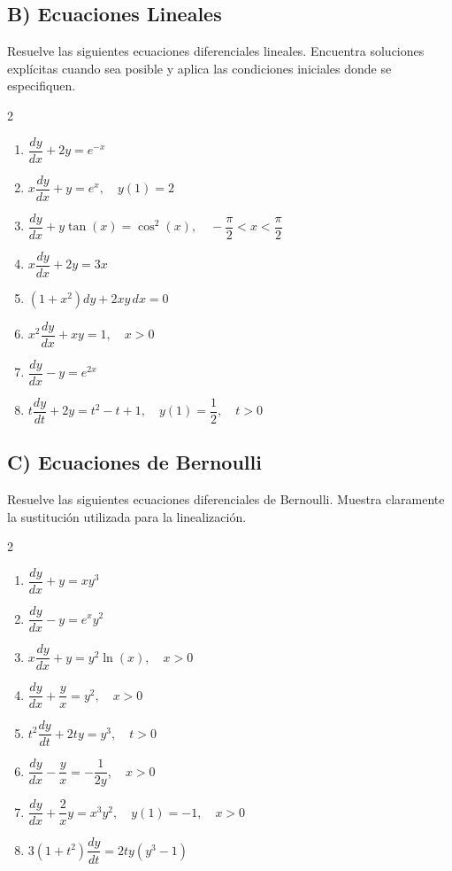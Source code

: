 \documentclass[a4paper,11pt]{article}
\begin{document}
\subsection*{B) Ecuaciones Lineales}
Resuelve las siguientes ecuaciones diferenciales lineales. Encuentra soluciones explícitas cuando sea posible y aplica las condiciones iniciales donde se especifiquen.

\begin{multicols}{2}
\begin{enumerate}[itemsep=0.1cm]
    \item $\dfrac{dy}{dx} + 2y = e^{-x}$
    \item $x\dfrac{dy}{dx} + y = e^x, \quad y(1) = 2$
    \item $\dfrac{dy}{dx} + y \tan(x) = \cos^2(x), \quad -\dfrac{\pi}{2} < x < \dfrac{\pi}{2}$
    \item $x\dfrac{dy}{dx} + 2y = 3x$
    \item $(1+x^2)dy + 2xy\,dx = 0$
    \item $x^2 \dfrac{dy}{dx} + xy = 1, \quad x > 0$
    \item $\dfrac{dy}{dx} - y = e^{2x}$
    \item $t \dfrac{dy}{dt} + 2y = t^2 - t + 1, \quad y(1) = \dfrac{1}{2}, \quad t > 0$
\end{enumerate}
\end{multicols}

\subsection*{C) Ecuaciones de Bernoulli}
Resuelve las siguientes ecuaciones diferenciales de Bernoulli. Muestra claramente la sustitución utilizada para la linealización.

\begin{multicols}{2}
\begin{enumerate}[itemsep=0.1cm]
    \item $\dfrac{dy}{dx} + y = xy^3$
    \item $\dfrac{dy}{dx} - y = e^x y^2$
    \item $x\dfrac{dy}{dx} + y = y^2 \ln(x), \quad x > 0$
    \item $\dfrac{dy}{dx} + \dfrac{y}{x} = y^2, \quad x > 0$
    \item $t^2 \dfrac{dy}{dt} + 2ty = y^3, \quad t > 0$
    \item $\dfrac{dy}{dx} - \dfrac{y}{x} = -\dfrac{1}{2y}, \quad x > 0$
    \item $\dfrac{dy}{dx} + \dfrac{2}{x}y = x^3 y^2, \quad y(1) = -1, \quad x > 0$
    \item $3(1+t^2)\dfrac{dy}{dt} = 2ty(y^3 - 1)$
\end{enumerate}
\end{multicols}
\end{document}
